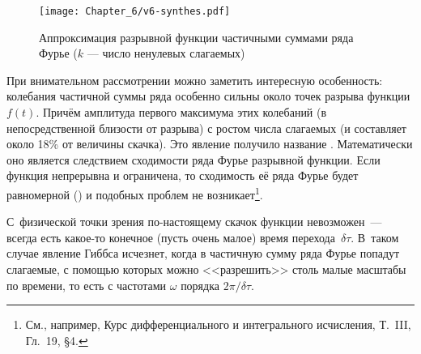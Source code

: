 \begin{figure}[h!]
    \hfill\texttt{[image: Chapter\_6/v6-synthes.pdf]}
    \caption{Аппроксимация разрывной функции частичными суммами ряда Фурье
        ($k$ --- число ненулевых слагаемых)}
\end{figure}

При внимательном рассмотрении можно заметить интересную особенность:
колебания частичной суммы ряда особенно сильны около точек разрыва
функции $f(t)$. Причём
амплитуда первого максимума этих колебаний (в непосредственной близости от
разрыва)  с ростом числа слагаемых (и составляет около 18\%
от величины скачка). Это явление получило название .
Математически оно является следствием  сходимости ряда
Фурье разрывной функции. Если функция непрерывна и ограничена, то сходимость
её ряда Фурье будет равномерной () и подобных проблем
не возникает\footnote{См., например,
 Курс дифференциального и интегрального исчисления,
Т.~III, Гл.~19, \S4.}.


С~физической точки зрения по-настоящему  скачок функции
невозможен~--- всегда есть какое-то конечное (пусть очень малое) время
перехода~$\delta\tau$. В~таком случае явление Гиббса исчезнет, когда в
частичную сумму ряда Фурье попадут слагаемые, с помощью которых можно
<<разрешить>> столь малые масштабы по времени, то есть с частотами
$\omega$ порядка $2\pi /\delta \tau$.

